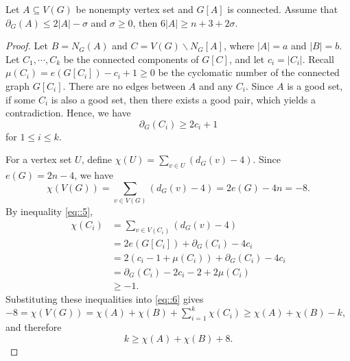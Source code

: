 \documentclass[10pt,a4paper]{amsart}
\begin{document}
  \begin{claim}\label{claim::1}
    Let $A\subseteq V(G)$ be nonempty vertex set and $G[A]$ is connected. Assume that $\partial_G(A)\leq2|A|-\sigma$ and $\sigma\geq0$, then $6|A|\ge n+3+2\sigma$.
  \end{claim}

  \begin{proof}
    Let $B=N_G(A)$ and $C=V(G)\backslash N_G[A]$, where $|A|=a$ and $|B|=b$. Let $C_1,\cdots,C_k$ be the connected components of $G[C]$, and let $c_i=|C_i|$. Recall $\mu(C_i)=e(G[C_i])-c_i+1\geq 0$ be the cyclomatic number of the connected graph $G[C_i]$. There are no edges between $A$ and any $C_i$. Since $A$ is a good set, if some $C_i$ is also a good set, then there exists a good pair, which yields a contradiction. Hence, we have
    \begin{equation}\label{eq::5}
      \partial_G(C_i)\geq2c_i+1
    \end{equation}
    for $1\leq i\leq k$.

    For a vertex set $U$, define $\chi(U)=\sum_{v\in U}(d_G(v)-4)$. Since $e(G)=2n-4$, we have
    \begin{equation}\label{eq::6}
      \chi(V(G))=\sum_{v\in V(G)}(d_G(v)-4)=2e(G)-4n=-8.
    \end{equation}
    By inequality \eqref{eq::5},
    \begin{equation*}
      \begin{aligned}
        \chi(C_i)
         & =\sum_{v\in V(C_i)}(d_G(v)-4)           \\
         & =2e(G[C_i])+\partial_G(C_i)-4c_i        \\
         & =2(c_i-1+\mu(C_i))+\partial_G(C_i)-4c_i \\
         & =\partial_G(C_i)-2c_i-2+2\mu(C_i)       \\
         & \geq-1.
      \end{aligned}
    \end{equation*}
    Substituting these inequalities into \eqref{eq::6} gives
    $
      -8= \chi(V(G))=\chi(A)+\chi(B)+\sum_{i=1}^k\chi(C_i)
      \geq \chi(A)+\chi(B)-k,
    $
    and therefore
    \begin{equation}\label{eq::7}
      k\ge\chi(A)+\chi(B)+8.
    \end{equation}


\end{proof}
\end{document}

